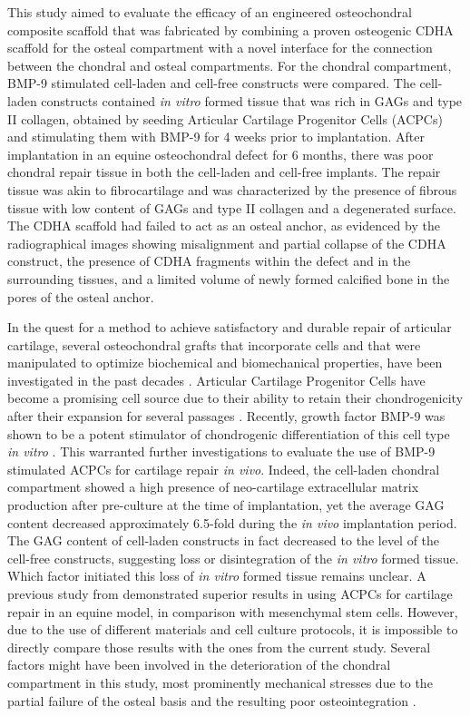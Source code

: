 \documentclass[twocolumn, empirical, authordate, issue]{jote-new-article}
\begin{document}
This study aimed to evaluate the efficacy of an engineered osteochondral composite scaffold that was fabricated by combining a proven osteogenic CDHA scaffold for the osteal compartment with a novel interface for the connection between the chondral and osteal compartments. For the chondral compartment, BMP-9 stimulated cell-laden and cell-free constructs were compared. The cell-laden constructs contained \emph{in vitro} formed tissue that was rich in GAGs and type II collagen, obtained by seeding Articular Cartilage Progenitor Cells (ACPCs) and stimulating them with BMP-9 for 4 weeks prior to implantation. After implantation in an equine osteochondral defect for 6 months, there was poor chondral repair tissue in both the cell-laden and cell-free implants. The repair tissue was akin to fibrocartilage and was characterized by the presence of fibrous tissue with low content of GAGs and type II collagen and a degenerated surface. The CDHA scaffold had failed to act as an osteal anchor, as evidenced by the radiographical images showing misalignment and partial collapse of the CDHA construct, the presence of CDHA fragments within the defect and in the surrounding tissues, and a limited volume of newly formed calcified bone in the pores of the osteal anchor.

In the quest for a method to achieve satisfactory and durable repair of articular cartilage, several osteochondral grafts that incorporate cells and that were manipulated to optimize biochemical and biomechanical properties, have been investigated in the past decades \parencite{Huang2016}. Articular Cartilage Progenitor Cells have become a promising cell source due to their ability to retain their chondrogenicity after their expansion for several passages \parencite{Williams2010}. Recently, growth factor BMP-9 was shown to be a potent stimulator of chondrogenic differentiation of this cell type \emph{in vitro} \parencite{Morgan2020}. This warranted further investigations to evaluate the use of BMP-9 stimulated ACPCs for cartilage repair \emph{in vivo}. Indeed, the cell-laden chondral compartment showed a high presence of neo-cartilage extracellular matrix production after pre-culture at the time of implantation, yet the average GAG content decreased approximately 6.5-fold during the \emph{in vivo} implantation period. The GAG content of cell-laden constructs in fact decreased to the level of the cell-free constructs, suggesting loss or disintegration of the \emph{in vitro}
formed tissue. Which factor initiated this loss of \emph{in vitro}
formed tissue remains unclear. A previous study from \textcite{McCarthy2012} demonstrated superior results in using ACPCs for cartilage repair in an equine model, in comparison with mesenchymal stem cells. However, due to the use of different materials and cell culture protocols, it is impossible to directly compare those results with the ones from the current study. Several factors might have been involved in the deterioration of the chondral compartment in this study, most prominently mechanical stresses due to the partial failure of the osteal basis and the resulting poor osteointegration \parencite{Heuijerjans2018}.
\end{document}
